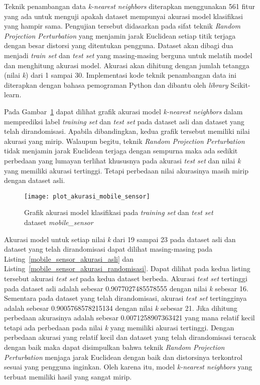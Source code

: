 Teknik penambangan data \textit{k-nearest neighbors} diterapkan menggunakan 561 fitur yang ada untuk menguji apakah dataset mempunyai akurasi model klasifikasi yang hampir sama. Pengujian tersebut didasarkan pada sifat teknik \textit{Random Projection Perturbation} yang menjamin jarak Euclidean setiap titik terjaga dengan besar distorsi yang ditentukan pengguna. Dataset akan dibagi dua menjadi \textit{train set} dan \textit{test set} yang masing-masing berguna untuk melatih model dan menghitung akurasi model. Akurasi akan dihitung dengan jumlah tetangga (nilai \textit{k}) dari 1 sampai 30. Implementasi kode teknik penambangan data ini diterapkan dengan bahasa pemograman Python dan dibantu oleh \textit{library} Scikit-learn.

Pada Gambar~\ref{fig:plot_akurasi_mobile_sensor} dapat dilihat grafik akurasi model \textit{k-nearest neighbors} dalam memprediksi label \textit{training set} dan \textit{test set} pada dataset asli dan dataset yang telah dirandomisasi. Apabila dibandingkan, kedua grafik tersebut memiliki nilai akurasi yang mirip. Walaupun begitu, teknik \textit{Random Projection Perturbation} tidak menjamin jarak Euclidean terjaga dengan sempurna maka ada sedikit perbedaan yang lumayan terlihat khususnya pada akurasi \textit{test set} dan nilai \textit{k} yang memiliki akurasi tertinggi. Tetapi perbedaan nilai akurasinya masih mirip dengan dataset asli. 
	
\begin{figure}
	\centering
	\texttt{[image: plot\_akurasi\_mobile\_sensor]}
	\caption{Grafik akurasi model klasifikasi pada \textit{training set} dan \textit{test set} dataset \textit{mobile\_sensor}}
	\label{fig:plot_akurasi_mobile_sensor}
\end{figure}

Akurasi model untuk setiap nilai \textit{k} dari 19 sampai 23 pada dataset asli dan dataset yang telah dirandomisasi dapat dilihat masing-masing pada Listing~\ref{mobile_sensor_akurasi_asli} dan Listing~\ref{mobile_sensor_akurasi_randomisasi}. Dapat dilihat pada kedua listing tersebut akurasi \textit{test set} pada kedua dataset berbeda. Akurasi \textit{test set} tertinggi pada dataset asli adalah sebesar 0.9077027485578555 dengan nilai \textit{k} sebesar 16. Sementara pada dataset yang telah dirandomisasi, akurasi \textit{test set} tertingginya adalah sebesar 0.9005768578215134 dengan nilai \textit{k} sebesar 21. Jika dihitung perbedaan akurasinya adalah sebesar 0.0071258907363421 yang mana relatif kecil tetapi ada perbedaan pada nilai \textit{k} yang memiliki akurasi tertinggi. Dengan perbedaan akurasi yang relatif kecil dan dataset yang telah dirandomisasi teracak dengan baik maka dapat disimpulkan bahwa teknik \textit{Random Projection Perturbation} menjaga jarak Euclidean dengan baik dan distorsinya terkontrol sesuai yang pengguna inginkan. Oleh karena itu, model \textit{k-nearest neighbors} yang terbuat memiliki hasil yang sangat mirip.
	
